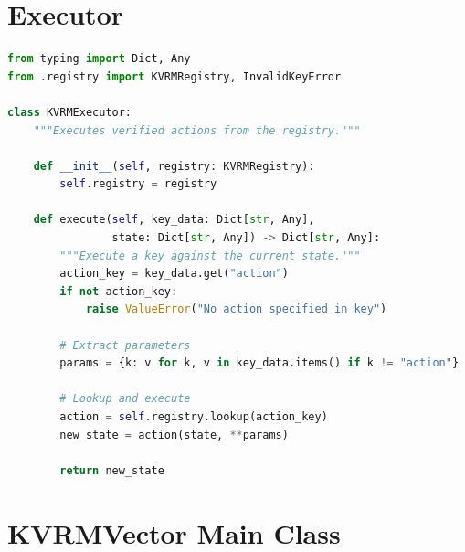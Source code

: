 \documentclass[11pt,a4paper]{article}
\begin{document}
\section{Executor}

\begin{lstlisting}[language=Python, caption={executor.py}]
from typing import Dict, Any
from .registry import KVRMRegistry, InvalidKeyError

class KVRMExecutor:
    """Executes verified actions from the registry."""

    def __init__(self, registry: KVRMRegistry):
        self.registry = registry

    def execute(self, key_data: Dict[str, Any],
                state: Dict[str, Any]) -> Dict[str, Any]:
        """Execute a key against the current state."""
        action_key = key_data.get("action")
        if not action_key:
            raise ValueError("No action specified in key")

        # Extract parameters
        params = {k: v for k, v in key_data.items() if k != "action"}

        # Lookup and execute
        action = self.registry.lookup(action_key)
        new_state = action(state, **params)

        return new_state
\end{lstlisting}

\section{KVRMVector Main Class}
\end{document}
